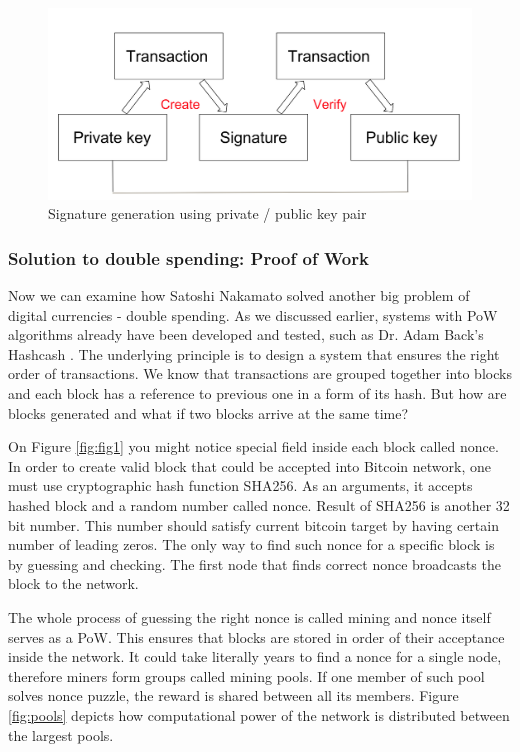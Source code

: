 \documentclass[conference,compsoc]{IEEEtran}
\begin{document}
\begin{figure}[h]
  \centering
  \includegraphics[width=.45\textwidth]{graphics/private_public.png}
  \caption{Signature generation using private / public key pair}
  \label{fig:fig2}
\end{figure}

\subsubsection{Solution to double spending: Proof of Work}
Now we can examine how Satoshi Nakamato solved another big problem of digital currencies - double spending.
As we discussed earlier, systems with PoW algorithms already have been developed and tested, such as Dr. Adam Back's Hashcash \cite{hashcash}. 
The underlying principle is to design a system that ensures the right order of transactions. 
We know that transactions are grouped together into blocks and each block has a reference to previous one in a form of its hash. 
But how are blocks generated and what if two blocks arrive at the same time? 

On Figure \ref{fig:fig1} you might notice special field inside each block called nonce. 
In order to create valid block that could be accepted into Bitcoin network, one must use cryptographic hash function SHA256. 
As an arguments, it accepts hashed block and a random number called nonce.
Result of SHA256 is another 32 bit number. 
This number should satisfy current bitcoin target by having certain number of leading zeros. 
The only way to find such nonce for a specific block is by guessing and checking. 
The first node that finds correct nonce broadcasts the block to the network. 

The whole process of guessing the right nonce is called mining and nonce itself serves as a PoW. 
This ensures that blocks are stored in order of their acceptance inside the network.
It could take literally years to find a nonce for a single node, therefore miners form groups called mining pools.
If one member of such pool solves nonce puzzle, the reward is shared between all its members. 
Figure \ref{fig:pools} depicts how computational power of the network is distributed between the largest pools.
\end{document}
